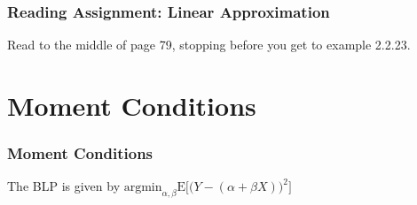 \documentclass[12pt, block=fill]{beamer}
\newcommand{\E}{\text{E}}
\begin{document}
 \begin{frame}
   \frametitle{Reading Assignment: Linear Approximation}
   
   Read to the middle of page 79, stopping before you get to example
   2.2.23.  
   \end{frame}
   
   \section{Moment Conditions}
   
   \begin{frame}[t]
  \frametitle{Moment Conditions}
  The BLP is given by  $\text{argmin}_{\alpha, \beta} \E\Big[ \big( Y - (\alpha + \beta X) \big)^2 \Big]$
\end{frame}
\end{document}
